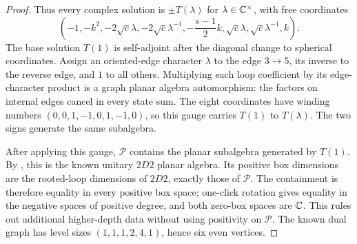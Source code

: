 \begin{proof}
Thus every complex solution is $\pm T(\lambda)$ for
$\lambda\in\mathbb C^\times$, with free coordinates
\[
\left(-1,-k^2,-2\sqrt c\lambda,-2\sqrt c\lambda^{-1},
 -\frac{s-1}{2}k,\sqrt c\lambda,
 \sqrt c\lambda^{-1},k\right).
\]
The base solution $T(1)$ is self-adjoint after the diagonal
change to spherical coordinates. Assign an oriented-edge
character $\lambda$ to the edge $3\to5$, its inverse to the
reverse edge, and $1$ to all others. Multiplying each loop
coefficient by its edge-character product is a graph planar
algebra automorphism: the factors on internal edges cancel in
every state sum. The eight coordinates have winding numbers
$(0,0,1,-1,0,1,-1,0)$, so this gauge carries $T(1)$ to
$T(\lambda)$. The two signs generate the same subalgebra.

After applying this gauge, $\mathcal P$ contains the planar
subalgebra generated by $T(1)$. By
\cite[Lemma~3.4 and Theorems~7.8--7.9]{MorrisonPenneys2D2},
this is the known unitary $2D2$ planar algebra. Its positive
box dimensions are the rooted-loop dimensions of $2D2$,
exactly those of $\mathcal P$. The containment is therefore
equality in every positive box space; one-click rotation gives
equality in the negative spaces of positive degree, and both
zero-box spaces are $\mathbb C$. This rules out additional
higher-depth data without using positivity on $\mathcal P$.
The known dual graph has level sizes $(1,1,1,2,4,1)$, hence
six even vertices.
\end{proof}

